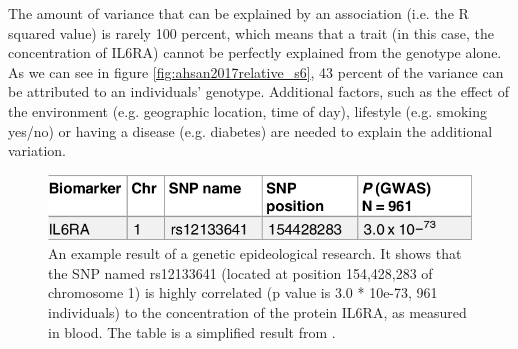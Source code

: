 The amount of variance that can be explained by an association (i.e.
the R squared value) is rarely 100 percent, which means that a trait (in
this case, the concentration of IL6RA) cannot be perfectly explained
from the genotype alone. As we can see in figure \ref{fig:ahsan2017relative_s6}, 
43 percent of the variance can be attributed to an individuals'
genotype. 
Additional factors, 
such as the effect
of the environment (e.g. geographic location, time of day), 
lifestyle (e.g. smoking yes/no) or having a disease (e.g. diabetes) 
are needed to explain the additional variation.

\begin{figure}[!htbp]
  \centering
  \includegraphics[width=\linewidth]{ahsan2017relative_table_2_sub.png}
  \caption{
    An example result of a genetic epideological research.
    It shows that the SNP named rs12133641 (located at position 154,428,283
    of chromosome 1) is highly correlated (p value is 3.0 * 10e-73, 
    961 individuals) to the concentration of the protein IL6RA, as measured
    in blood. The table is a simplified result from \cite{ahsan2017relative}.
  }
  \label{fig:ahsan2017relative_table_2_sub}
\end{figure}


